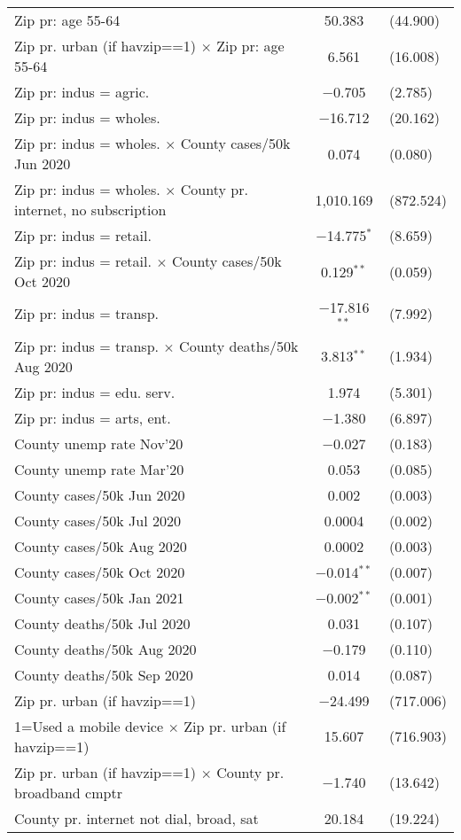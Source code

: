 \begin{table}[!htbp]
\begin{tabular}{@{\extracolsep{5pt}}lc}
  Zip pr: age 55-64 & 50.383 & (44.900) \\ 
  Zip pr. urban (if havzip==1) $\times$ Zip pr: age 55-64 & 6.561 & (16.008) \\ 
  Zip pr: indus = agric. & $-$0.705 & (2.785) \\ 
  Zip pr: indus = wholes. & $-$16.712 & (20.162) \\ 
  Zip pr: indus = wholes. $\times$ County cases/50k Jun 2020 & 0.074 & (0.080) \\ 
  Zip pr: indus = wholes. $\times$ County pr. internet, no subscription & 1,010.169 & (872.524) \\ 
  Zip pr: indus = retail. & $-$14.775$^{*}$ & (8.659) \\ 
  Zip pr: indus = retail. $\times$ County cases/50k Oct 2020 & 0.129$^{**}$ & (0.059) \\ 
  Zip pr: indus = transp. & $-$17.816$^{**}$ & (7.992) \\ 
  Zip pr: indus = transp. $\times$ County deaths/50k Aug 2020 & 3.813$^{**}$ & (1.934) \\ 
  Zip pr: indus = edu. serv. & 1.974 & (5.301) \\ 
  Zip pr: indus = arts, ent. & $-$1.380 & (6.897) \\ 
  County unemp rate Nov'20 & $-$0.027 & (0.183) \\ 
  County unemp rate Mar'20 & 0.053 & (0.085) \\ 
  County cases/50k Jun 2020 & 0.002 & (0.003) \\ 
  County cases/50k Jul 2020 & 0.0004 & (0.002) \\ 
  County cases/50k Aug 2020 & 0.0002 & (0.003) \\ 
  County cases/50k Oct 2020 & $-$0.014$^{**}$ & (0.007) \\ 
  County cases/50k Jan 2021 & $-$0.002$^{**}$ & (0.001) \\ 
  County deaths/50k Jul 2020 & 0.031 & (0.107) \\ 
  County deaths/50k Aug 2020 & $-$0.179 & (0.110) \\ 
  County deaths/50k Sep 2020 & 0.014 & (0.087) \\ 
  Zip pr. urban (if havzip==1) & $-$24.499 & (717.006) \\ 
  1=Used a mobile device $\times$ Zip pr. urban (if havzip==1) & 15.607 & (716.903) \\ 
  Zip pr. urban (if havzip==1) $\times$ County pr. broadband cmptr & $-$1.740 & (13.642) \\ 
  County pr. internet not dial, broad, sat & 20.184 & (19.224) \\ 

\end{tabular}
\end{table}
